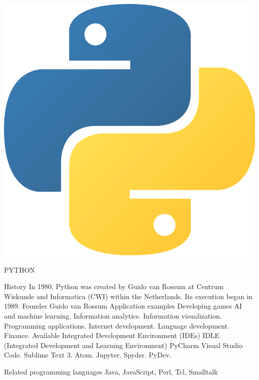 \documentclass{article}
\begin{document}
{\begin{tcolorbox}[width=\textwidth,colback={green},outer arc=0mm,colupper=white]
\end{tcolorbox} 
	\newpage
	\includegraphics[width=\linewidth,height=\linewidth]{Picture4.png}
\centering
\begin{tcolorbox}[width=\linewidth,colback={blue},outer arc=0mm,colupper=white]    
	\huge PYTHON
	
\end{tcolorbox} 
	\newpage

History
In 1980, Python was created by Guido van Rossum at Centrum Wiskunde and Informatica (CWI) within the Netherlands. 
Its execution began in 1989.
Founder
Guido van Rossum
Application examples
Developing games
AI and machine learning. 
Information analytics.
Information visualization. 
Programming applications. 
Internet development. 
Language development. 
Finance.
Available Integrated Development Environment (IDEs) 
IDLE (Integrated Development and Learning Environment)
PyCharm
Visual Studio Code. 
Sublime Text 3. 
Atom. 
Jupyter. 
Spyder. 
PyDev.

Related programming languages
Java, JavaScript, Perl, Tcl, Smalltalk

}
\end{document}
